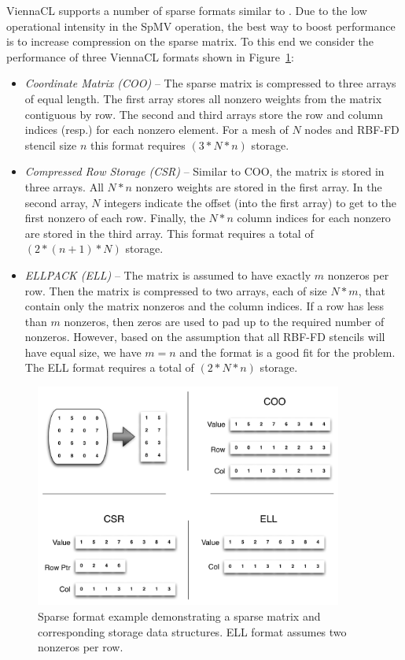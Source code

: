 \documentclass{report}
\begin{document}
ViennaCL supports a number of sparse formats similar to \cite{Bell2009,Cusp2012}. Due to the low operational intensity in the SpMV operation, the best way to boost performance is to increase compression on the sparse matrix. To this end we consider the performance of three ViennaCL formats shown in Figure~\ref{fig:sparse_format}: 
\begin{itemize} 
\item \emph{Coordinate Matrix (COO)} -- The sparse matrix is compressed to three arrays of equal length. The first array stores all nonzero weights from the matrix contiguous by row. The second and third arrays store the row and column indices (resp.) for each nonzero element. For a mesh of $N$ nodes and RBF-FD stencil size $n$ this format requires $(3*N*n)$ storage.  %
\item \emph{Compressed Row Storage (CSR)} -- Similar to COO, the matrix is stored in three arrays. All $N*n$ nonzero weights are stored in the first array. In the second array, $N$ integers indicate the offset (into the first array) to get to the first nonzero of each row. Finally, the $N*n$ column indices for each nonzero are stored in the third array. This format requires a total of $(2*(n+1)*N)$ storage.
\item \emph{ELLPACK (ELL)} -- The matrix is assumed to have exactly $m$ nonzeros per row. Then the matrix is compressed to two arrays, each of size $N*m$, that contain only the matrix nonzeros and the column indices. If a row has less than $m$ nonzeros, then zeros are used to pad up to the required number of nonzeros. However, based on the assumption that all RBF-FD stencils will have equal size, we have $m=n$ and the format is a good fit for the problem. The ELL format requires a total of $(2*N*n)$ storage. 
\end{itemize}


\begin{figure}
\centering
\includegraphics[width=0.9\textwidth]{gpu_content/omnigraffle/SparseStorage.pdf}
\caption{Sparse format example demonstrating a sparse matrix and corresponding storage data structures. ELL format assumes two nonzeros per row. }
\label{fig:sparse_format}
\end{figure}
\end{document}
